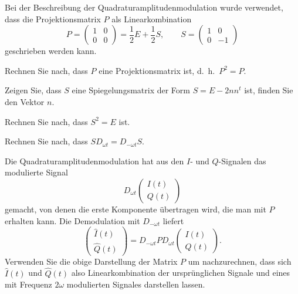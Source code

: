 Bei der Beschreibung der Quadraturamplitudenmodulation wurde
verwendet, dass die Projektionsmatrix $P$ als Linearkombination
\[
P
=
\begin{pmatrix}
1&0\\
0&0
\end{pmatrix}
=
\frac12E+\frac12S,
\qquad
S
=
\begin{pmatrix}
1&0\\
0&-1
\end{pmatrix}
\]
geschrieben werden kann.
\begin{teilaufgaben}
\item
Rechnen Sie nach, dass $P$ eine Projektionsmatrix ist, d.~h.~$P^2=P$.
\item
Zeigen Sie, dass $S$ eine Spiegelungsmatrix der Form $S=E-2nn^t$ ist,
finden Sie den Vektor $n$.
\item
Rechnen Sie nach, dass $S^2=E$ ist.
\item 
Rechnen Sie nach, dass $SD_{\omega t}=D_{-\omega t}S$.
\item
Die Quadraturamplitudenmodulation hat aus den $I$- und $Q$-Signalen
das modulierte Signal 
\[
D_{\omega t}\begin{pmatrix}I(t)\\Q(t)\end{pmatrix}
\]
gemacht, von denen die erste Komponente übertragen wird, die man mit
$P$ erhalten kann. 
Die Demodulation mit $D_{-\omega t}$ liefert
\[
\begin{pmatrix}
\hat{I}(t)\\
\hat{Q}(t)
\end{pmatrix}
=
D_{-\omega t}PD_{\omega t}
\begin{pmatrix}
I(t)\\
Q(t)
\end{pmatrix}.
\]
Verwenden Sie die obige Darstellung der Matrix $P$ um nachzurechnen,
dass sich $\hat{I}(t)$ und $\hat{Q}(t)$ also Linearkombination der
ursprünglichen Signale und eines mit Frequenz $2\omega$ modulierten
Signales darstellen lassen.
\end{teilaufgaben}


